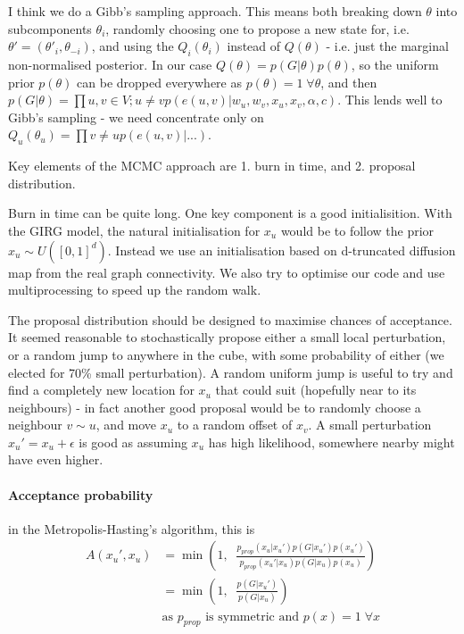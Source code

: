 I think we do a Gibb's sampling approach. This means both breaking down $\theta$ into subcomponents $\theta_i$, randomly choosing one to propose a new state for, i.e. $\theta' = (\theta'_i, \theta_{-i})$, and using the $Q_i(\theta_i)$ instead of $Q(\theta)$ - i.e. just the marginal non-normalised posterior. In our case $Q(\theta) = p(G | \theta) p(\theta)$, so the uniform prior $p(\theta)$ can be dropped everywhere as $p(\theta) = 1\; \forall \theta$, and then $p(G | \theta) = \prod{u, v \in V; u \neq v} p(e(u,v) | w_u, w_v, x_u, x_v, \alpha, c)$. This lends well to Gibb's sampling - we need concentrate only on $Q_u(\theta_u) = \prod{v \neq u} p(e(u,v) | ...)$.

Key elements of the MCMC approach are 1. burn in time, and 2. proposal distribution. 

Burn in time can be quite long. One key component is a good initialisition. With the GIRG model, the natural initialisation for $x_u$ would be to follow the prior $x_u \sim U([0, 1]^d)$. Instead we use an initialisation based on d-truncated diffusion map from the real graph connectivity. We also try to optimise our code and use multiprocessing to speed up the random walk.

The proposal distribution should be designed to maximise chances of acceptance. It seemed reasonable to stochastically propose either a small local perturbation, or a random jump to anywhere in the cube, with some probability of either (we elected for 70\% small perturbation). A random uniform jump is useful to try and find a completely new location for $x_u$ that could suit (hopefully near to its neighbours) - in fact another good proposal would be to randomly choose a neighbour $v \sim u$, and move $x_u$ to a random offset of $x_v$. A small perturbation $x_u' = x_u + \epsilon$ is good as assuming $x_u$ has high likelihood, somewhere nearby might have even higher.

\paragraph{Acceptance probability} in the Metropolis-Hasting's algorithm, this is 
\begin{align}
  A(x_u', x_u) &= \min \left (1,\;\;  \frac{p_{prop}(x_u | x_u') p(G | x_u') p(x_u')}{p_{prop}(x_u' | x_u) p(G | x_u) p(x_u)}\right )
  \\
  &= \min \left (1,\;\;  \frac{p(G | x_u')}{p(G | x_u)} \right )
  \\
  & \text{as $p_{prop}$ is symmetric and $p(x) = 1\; \forall x$}
\end{align}

